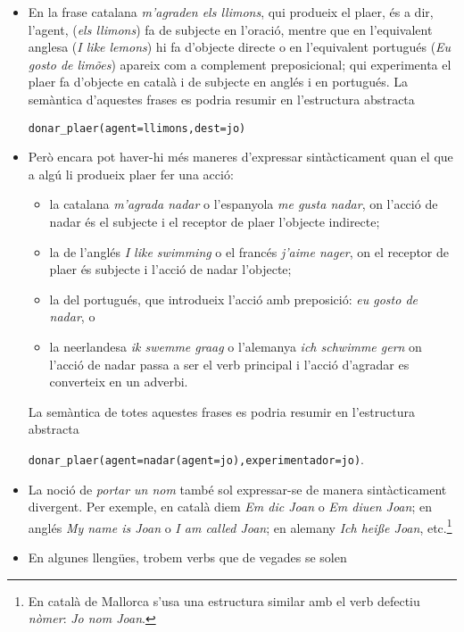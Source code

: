 \begin{itemize}
\item En la frase catalana \emph{m'agraden els llimons}, qui produeix
  el plaer, és a dir, l'agent, (\emph{els llimons}) fa de subjecte en
  l'oració, mentre que en l'equivalent anglesa (\emph{I like lemons})
  hi fa d'objecte directe o en l'equivalent portugués (\emph{Eu gosto
    de limões}) apareix com a complement preposicional; qui
  experimenta el plaer fa d'objecte en català i de subjecte en anglés
  i en portugués. La semàntica d'aquestes frases es podria resumir en
  l'estructura abstracta
  \begin{center}
    \texttt{donar\_plaer(agent=llimons,dest=jo)}
  \end{center}
\item \label{pg:magradanadar} Però encara pot haver-hi més maneres
  d'expressar sintàcticament quan el que a algú li produeix plaer fer
  una acció:
  \begin{itemize}
  \item la catalana \emph{m'agrada nadar} o l'espanyola \emph{me gusta
      nadar}, on l'acció de nadar és el subjecte i el receptor de
    plaer l'objecte indirecte;
  \item la de l'anglés \emph{I like swimming} o el francés
    \emph{j'aime nager}, on el receptor de plaer és subjecte i l'acció
    de nadar l'objecte;
  \item la del portugués, que introdueix l'acció amb preposició:
    \emph{eu gosto de nadar}, o
  \item la neerlandesa \emph{ik swemme graag} o l'alemanya \emph{ich
      schwimme gern} on l'acció de nadar passa a ser el verb principal
    i l'acció d'agradar es converteix en un adverbi.
  \end{itemize}
  La semàntica de totes aquestes frases es podria resumir en
  l'estructura abstracta
  \begin{center}
    \texttt{donar\_plaer(agent=nadar(agent=jo),experimentador=jo)}.
  \end{center}
\item La noció de \emph{portar un nom} també sol expressar-se de
  manera sintàcticament divergent. Per exemple, en català diem
  \emph{Em dic Joan} o \emph{Em diuen Joan}; en anglés \emph{My name
    is Joan} o \emph{I am called Joan}; en alemany \emph{Ich hei{\ss}e
    Joan}, etc.\footnote{En català de Mallorca s'usa una estructura
    similar amb el verb defectiu \emph{nòmer}: \emph{Jo nom Joan}.}
\item En algunes llengües, trobem verbs que de vegades se solen

\end{itemize}
